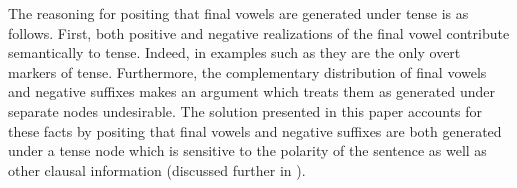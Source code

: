 \documentclass[output=paper]{langsci/langscibook}
\begin{document}
{

% 
% 
% 



 





The reasoning for positing that final vowels are generated under tense is as follows. First, both positive and negative realizations of the final vowel contribute semantically to tense. Indeed, in examples such as  they are the only overt markers of tense. Furthermore, the complementary distribution of final vowels and negative suffixes makes an argument which treats them as generated under separate nodes undesirable. The solution presented in this paper accounts for these facts by positing that final vowels and negative suffixes are both generated under a tense node which is sensitive to the polarity of the sentence as well as other clausal information (discussed further in ).


}
\end{document}
